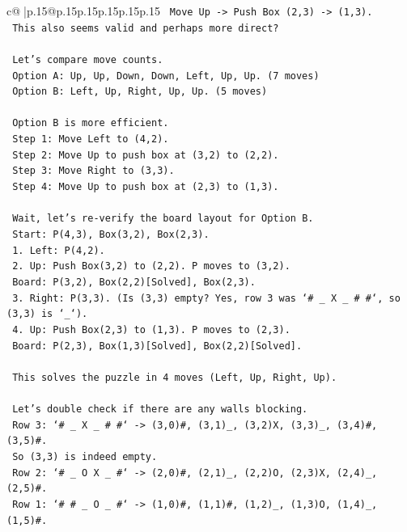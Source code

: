 \documentclass{article}
\begin{document}
{\begin{supertabular}{c@{$\;$}|p{.15\linewidth}@{}p{.15\linewidth}p{.15\linewidth}p{.15\linewidth}p{.15\linewidth}p{.15\linewidth}}
{{{\texttt{      Move Up {-}> Push Box (2,3) {-}> (1,3).} \\
\texttt{      This also seems valid and perhaps more direct?} \\
\\ 
\texttt{   Let's compare move counts.} \\
\texttt{   Option A: Up, Up, Down, Down, Left, Up, Up. (7 moves)} \\
\texttt{   Option B: Left, Up, Right, Up, Up. (5 moves)} \\
\\ 
\texttt{   Option B is more efficient.} \\
\texttt{   Step 1: Move Left to (4,2).} \\
\texttt{   Step 2: Move Up to push box at (3,2) to (2,2).} \\
\texttt{   Step 3: Move Right to (3,3).} \\
\texttt{   Step 4: Move Up to push box at (2,3) to (1,3).} \\
\\ 
\texttt{   Wait, let's re{-}verify the board layout for Option B.} \\
\texttt{   Start: P(4,3), Box(3,2), Box(2,3).} \\
\texttt{   1. Left: P(4,2).} \\
\texttt{   2. Up: Push Box(3,2) to (2,2). P moves to (3,2).} \\
\texttt{      Board: P(3,2), Box(2,2){[}Solved{]}, Box(2,3).} \\
\texttt{   3. Right: P(3,3). (Is (3,3) empty? Yes, row 3 was `\# \_ X \_ \# \#`, so (3,3) is `\_`).} \\
\texttt{   4. Up: Push Box(2,3) to (1,3). P moves to (2,3).} \\
\texttt{      Board: P(2,3), Box(1,3){[}Solved{]}, Box(2,2){[}Solved{]}.} \\
\\ 
\texttt{   This solves the puzzle in 4 moves (Left, Up, Right, Up).} \\
\\ 
\texttt{   Let's double check if there are any walls blocking.} \\
\texttt{   Row 3: `\# \_ X \_ \# \#` {-}> (3,0)\#, (3,1)\_, (3,2)X, (3,3)\_, (3,4)\#, (3,5)\#.} \\
\texttt{   So (3,3) is indeed empty.} \\
\texttt{   Row 2: `\# \_ O X \_ \#` {-}> (2,0)\#, (2,1)\_, (2,2)O, (2,3)X, (2,4)\_, (2,5)\#.} \\
\texttt{   Row 1: `\# \# \_ O \_ \#` {-}> (1,0)\#, (1,1)\#, (1,2)\_, (1,3)O, (1,4)\_, (1,5)\#.} \\
}}}
\end{supertabular}}
\end{document}
